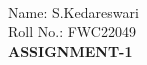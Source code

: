 \documentclass[10pt]{report}
\begin{document}
 \vspace{3mm}\\ \raggedright Name: S.Kedareswari\hspace{12cm}\\
\raggedleft Roll No.: FWC22049
\\ \centering \Large \textbf{ASSIGNMENT-1}\vspace{3mm}\normalsize\\ 
\end{document}
